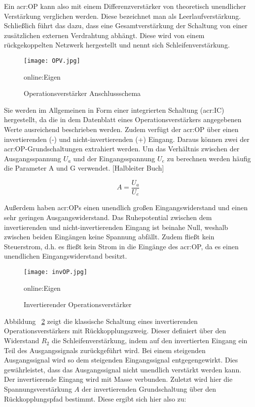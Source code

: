 Ein \gls{acr:OP} kann also mit einem Differenzverstärker von theoretisch unendlicher Verstärkung verglichen werden. Diese bezeichnet man als Leerlaufverstärkung. Schließlich führt das dazu, dass eine Gesamtverstärkung der Schaltung von einer zusätzlichen externen Verdrahtung abhängt. Diese wird von einem rückgekoppelten Netzwerk hergestellt und nennt sich Schleifenverstärkung.\cite{lutzHalbleiterLeistungsbauelemente2012}

\begin{figure}[H]
	\centering
	\texttt{[image: OPV.jpg]}
	\caption[Operationsverstärker Anschlussschema]{Operationsverstärker Anschlussschema} 
	\gls{online:Eigen}
	\label{fig:OPV}
\end{figure}

Sie werden im Allgemeinen in Form einer integrierten Schaltung (\gls{acr:IC}) hergestellt, da die in dem Datenblatt eines Operationsverstärkers angegebenen Werte ausreichend beschrieben werden. Zudem verfügt der \gls{acr:OP} über einen invertierenden (-) und nicht-invertierenden (+) Eingang. Daraus können zwei der \gls{acr:OP}-Grundschaltungen extrahiert werden. Um das Verhältnis zwischen der Ausgangsspannung $U_{a}$ und der Eingangsspannung $U_{e}$ zu berechnen werden häufig die Parameter A und G verwendet. [Halbleiter Buch]

\begin{equation}
	\label{equ:bsp1}
	A = \frac{U_{a}}{U_{e}}
\end{equation}

Außerdem haben \gls{acr:OP}s einen unendlich großen Eingangswiderstand und einen sehr geringen Ausgangswiderstand.
Das Ruhepotential zwischen dem invertierenden und nicht-invertierenden Eingang ist beinahe Null, weshalb zwischen beiden Eingängen keine Spannung abfällt. Zudem fließt kein Steuerstrom, d.h. es fließt kein Strom in die Eingänge des \gls{acr:OP}, da es einen unendlichen Eingangswiderstand besitzt.\cite{OP}
\begin{figure}[H]
	\centering
	\texttt{[image: invOP.jpg]}
	\caption[Invertierender Operationsverstärker]{Invertierender Operationsverstärker} 
	\gls{online:Eigen}
	\label{fig:ninvOP}
\end{figure}

Abbildung ~\ref{fig:ninvOP} zeigt die klassische Schaltung eines invertierenden Operationsverstärkers mit
Rückkopplungszweig. Dieser definiert über den Widerstand $R_{2}$ die Schleifenverstärkung, indem auf den invertierten Eingang ein Teil des Ausgangssignals zurückgeführt wird.  Bei einem steigenden Ausgangssignal wird so dem steigenden Eingangssignal entgegengewirkt. Dies gewährleistet, dass das Ausgangssignal nicht unendlich verstärkt werden kann. Der invertierende Eingang wird mit Masse verbunden. Zuletzt wird hier die Spannungsverstärkung $A$ der invertierenden Grundschaltung über den Rückkopplungspfad bestimmt. Diese ergibt sich hier also zu: 

